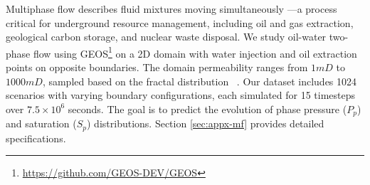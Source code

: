 Multiphase flow describes fluid mixtures moving simultaneously —a process critical for underground resource management, including oil and gas extraction, geological carbon storage, and nuclear waste disposal. We study oil-water two-phase flow using GEOS\footnote{\href{https://github.com/GEOS-DEV/GEOS}{https://github.com/GEOS-DEV/GEOS}} on a 2D domain with water injection and oil extraction points on opposite boundaries. The domain permeability ranges from $1mD$ to $1000mD$, sampled based on the fractal distribution ~\citep{tang2021fractal}. Our dataset includes 1024 scenarios with varying boundary configurations, each simulated for 15 timesteps over $7.5\times10^6$ seconds. The goal is to predict the evolution of phase pressure ($P_p$) and saturation ($S_p$) distributions. Section \ref{sec:appx-mf} provides detailed specifications.


